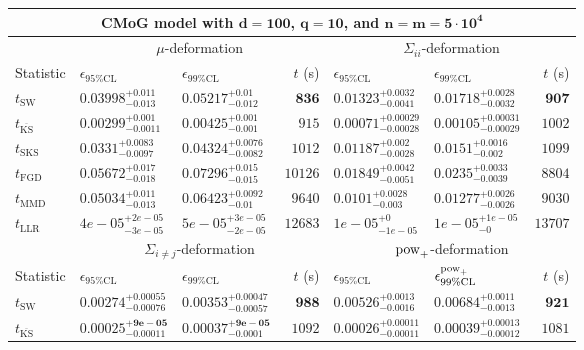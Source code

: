 \begin{tabular}{l|llr|llr}
	\toprule
	\multicolumn{7}{c}{{\bf CMoG model with $\mathbf{d=100}$, $\mathbf{q=10}$, and $\mathbf{n=m=5\cdot 10^{4}}$}} \\
	\toprule
	\multicolumn{1}{c}{} & \multicolumn{3}{c}{$\mu$-deformation} & \multicolumn{3}{c}{$\Sigma_{ii}$-deformation} \\
	Statistic & $\epsilon_{95\%\mathrm{CL}}$ & $\epsilon_{99\%\mathrm    {CL}}$ & $t$ (s) & $\epsilon_{95\%\mathrm{CL}}$ & $\epsilon_{99\%\mathrm{CL}}$ & $t$ (s) \\
	\midrule
	$t_{\mathrm{SW}}$ & $0.03998_{-0.013}^{+0.011}$ & $0.05217_{-0.012}^{+0.01}$ & ${\mathbf{836}}$ & $0.01323_{-0.0041}^{+0.0032}$ & $0.01718_{-0.0032}^{+0.0028}$ & ${\mathbf{907}}$ \\
	$t_{\overline{\mathrm{KS}}}$ & ${\mathbf{0.00299_{-0.0011}^{+0.001}}}$ & ${\mathbf{0.00425_{-0.001}^{+0.001}}}$ & $915$ & ${\mathbf{0.00071_{-0.00028}^{+0.00029}}}$ & ${\mathbf{0.00105_{-0.00029}^{+0.00031}}}$ & $1002$ \\
	$t_{\mathrm{SKS}}$ & $0.0331_{-0.0097}^{+0.0083}$ & $0.04324_{-0.0082}^{+0.0076}$ & $1012$ & $0.01187_{-0.0028}^{+0.002}$ & $0.0151_{-0.002}^{+0.0016}$ & $1099$ \\
	$t_{\mathrm{FGD}}$ & $0.05672_{-0.018}^{+0.017}$ & $0.07296_{-0.015}^{+0.015}$ & $10126$ & $0.01849_{-0.0051}^{+0.0042}$ & $0.0235_{-0.0039}^{+0.0033}$ & $8804$ \\
	$t_{\mathrm{MMD}}$ & $0.05034_{-0.013}^{+0.011}$ & $0.06423_{-0.01}^{+0.0092}$ & $9640$ & $0.0101_{-0.003}^{+0.0028}$ & $0.01277_{-0.0026}^{+0.0026}$ & $9030$ \\
	$t_{\mathrm{LLR}}$ & $4e-05_{-3e-05}^{+2e-05}$ & $5e-05_{-2e-05}^{+3e-05}$ & $12683$ & $1e-05_{-1e-05}^{+0}$ & $1e-05_{-0}^{+1e-05}$ & $13707$ \\
	\toprule
	\multicolumn{1}{c}{} & \multicolumn{3}{c}{$\Sigma_{i\neq j}$-deformation} & \multicolumn{3}{c}{$\rm{pow}_{+}$-deformation} \\
	Statistic & $\epsilon_{95\%\mathrm{CL}}$ & $\epsilon_{99\%\mathrm{CL}}$ & $t$ (s) & $\epsilon_{95\%\mathrm{CL}}$ & $\epsilon^{\rm   {pow}_{+}}_{99\%\mathrm{CL}}$ & $t$ (s) \\
	\midrule
	$t_{\mathrm{SW}}$ & $0.00274_{-0.00076}^{+0.00055}$ & $0.00353_{-0.00057}^{+0.00047}$ & ${\mathbf{988}}$ & $0.00526_{-0.0016}^{+0.0013}$ & $0.00684_{-0.0013}^{+0.0011}$ & ${\mathbf{921}}$ \\
	$t_{\overline{\mathrm{KS}}}$ & ${\mathbf{0.00025_{-0.00011}^{+9e-05}}}$ & ${\mathbf{0.00037_{-0.0001}^{+9e-05}}}$ & $1092$ & ${\mathbf{0.00026_{-0.00011}^{+0.00011}}}$ & ${\mathbf{0.00039_{-0.00012}^{+0.00013}}}$ & $1081$ \\

\end{tabular}
